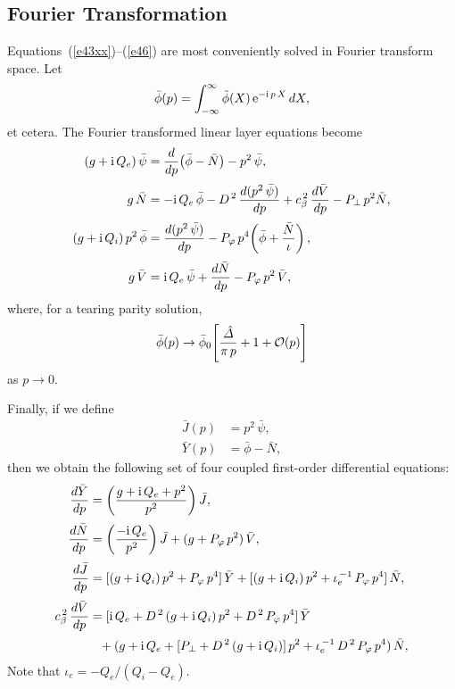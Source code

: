\documentclass[12pt,prb,aps]{revtex4-1}
\begin{document}
\subsection{Fourier Transformation}
Equations~(\ref{e43xx})--(\ref{e46}) are most conveniently solved in Fourier transform space.\cite{cole} 
Let
\begin{equation}
\bar{\phi}(p) = \int_{-\infty}^\infty \tilde{\phi}(X)\,{\rm e}^{-{\rm i}\,p\,X}\,dX,
\end{equation}
et cetera. The Fourier transformed linear layer equations become
\begin{align}\label{e314}
(g+{\rm i}\,Q_e)\,\bar{\psi}&=\frac{d}{dp}\!\left(\bar{\phi}-\bar{N}\right)-p^2\,\bar{\psi},\\[0.5ex]
g\,\bar{N} &= - {\rm i}\,Q_{e}\,\bar{\phi} -D^{\,2}\,\frac{d(p^2\,\bar{\psi})}{dp}+ c_\beta^{\,2}\,\frac{d\bar{V}}{dp}
  - P_\perp\,p^2\bar{N},\label{e316}\\[0.5ex]
(g+{\rm i}\,Q_i)\,p^2\,\bar{\phi}&=  \frac{d(p^2\,\bar{\psi})}{dp}- P_\varphi\,p^4\!\left(\bar{\phi} + \frac{\bar{N}}{\iota}\right),\\[0.5ex]
g\,\bar{V} &= {\rm i}\,Q_{e}\,\bar{\psi} +\frac{d\bar{N}}{dp}- P_\varphi\,p^2\,\bar{V},\label{e317}
\end{align}
where, for a tearing parity solution, 
\begin{equation}\label{e41}
\bar{\phi}(p)\rightarrow \bar{\phi}_0\!\left[\frac{\hat{\mit\Delta}}{\pi\,p} + 1+ {\cal O}(p)\right]
\end{equation}
as $p\rightarrow 0$. 

Finally, if we define 
\begin{align}
\bar{J}(p)&= p^2\,\bar{\psi},\\[0.5ex]
\bar{Y} (p)&= \bar{\phi}-\bar{N},\label{e43}
\end{align}
then we obtain the following set of four coupled first-order differential equations:
\begin{align}\label{e1}
\frac{d\bar{Y}}{dp} &= \left(\frac{g+{\rm i}\,Q_e+p^2}{p^2}\right)\bar{J},\\[0.5ex]
\frac{d\bar{N}}{dp} &= \left(\frac{-{\rm i}\,Q_e}{p^2}\right)\bar{J} + (g + P_\varphi\,p^2)\,\bar{V},\\[0.5ex]
\frac{d\bar{J}}{dp} &= [(g+{\rm i}\,Q_i)\,p^2 + P_\varphi\,p^4]\,\bar{Y}
+ [(g+{\rm i}\,Q_i)\,p^2 + \iota_e^{\,-1}\,P_\varphi\,p^4]\,\bar{N},\\[0.5ex]
c_\beta^{\,2}\,\frac{d\bar{V}}{dp} &= [{\rm i}\,Q_e+ D^{\,2}\,(g+{\rm i}\,Q_i)\,p^2 + D^{\,2}\,P_\varphi\,p^4]\,\bar{Y}
\nonumber\\[0.5ex]&\phantom{=} +(g+{\rm i}\,Q_e + [P_\perp+ D^{\,2}\,(g + {\rm i}\,Q_i)]\,p^2 + \iota_e^{\,-1}\,D^{\,2}\,P_\varphi\,p^4)\,\bar{N},\label{e4}
\end{align}
Note that $\iota_e= -Q_e/(Q_i-Q_e)$. 
\end{document}
